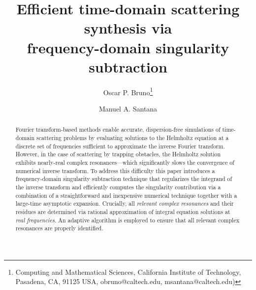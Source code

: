 \documentclass[11pt]{article}
\title{Efficient time-domain scattering synthesis via\\ frequency-domain singularity subtraction}
\author{Oscar P. Bruno\footnote{Computing and Mathematical Sciences, California Institute of Technology, Pasadena, CA, 91125 USA, obruno@caltech.edu, msantana@caltech.edu)}
  \and Manuel A. Santana\footnotemark[1]
}
\date{}
\theoremstyle{plain}
\theoremstyle{remark}
\begin{document}
\maketitle

\begin{abstract}
  Fourier transform-based methods enable accurate, dispersion-free
  simulations of time-domain scattering problems by evaluating
  solutions to the Helmholtz equation at a discrete set of frequencies
  sufficient to approximate the inverse Fourier transform. However, in
  the case of scattering by trapping obstacles, the Helmholtz solution
  exhibits nearly-real complex resonances---which significantly slows
  the convergence of numerical inverse transform. To address this
  difficulty this paper introduces a frequency-domain singularity
  subtraction technique that regularizes the integrand of the inverse
  transform and efficiently computes the singularity contribution via
  a combination of a straightforward and inexpensive numerical
  technique together with a large-time asymptotic
  expansion. Crucially, all {\em relevant complex resonances} and
  their residues are determined via rational approximation of integral
  equation solutions at {\em real frequencies}. An adaptive algorithm
  is employed to ensure that all relevant complex resonances are
  properly identified.
\end{abstract}
\end{document}
